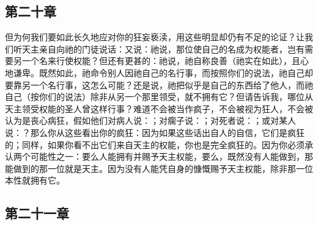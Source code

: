 
\subsection{第二十章}

\par

但为何我们要如此长久地应对你的狂妄亵渎，用这些明显却仍有不足的论证？让我们听天主亲自向祂的门徒说话：又说：祂说，那位使自己的名成为权能者，岂有需要另一个名来行使权能？但还有更甚的：祂说，祂自称良善（祂实在如此），且心地谦卑。既然如此，祂命令别人因祂自己的名行事，而按照你们的说法，祂自己却要靠另一个名行事，这怎么可能？还是说，祂把似乎是自己的东西给了他人，而祂自己（按你们的说法）除非从另一个那里领受，就不拥有它？但请告诉我，哪位从天主领受权能的圣人曾这样行事？难道不会被当作疯子，不会被视为狂人，不会被认为是丧心病狂，假如他们对病人说：；对瘸子说：；对死者说：；或对某人说：？那么你从这些看出你的疯狂：因为如果这些话出自人的自信，它们是疯狂的；同样，如果你看不出它们来自天主的权能，你也是完全疯狂的。因为你必须承认两个可能性之一：要么人能拥有并赐予天主权能，要么，既然没有人能做到，那能做到的那一位就是天主。因为没有人能凭自身的慷慨赐予天主权能，除非那一位本性就拥有它。\par


\subsection{第二十一章}

\par


